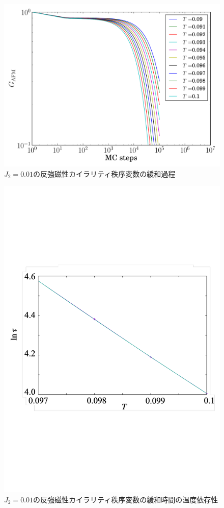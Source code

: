 \documentclass[12pt,titlepage,dvipdfmx]{jarticle}
\begin{document}
\begin{figure}[H]
   \centering
   \includegraphics[width=12cm]{figure/afvc_raw_data_j2_0.01.pdf}
   \caption{$J_2=0.01$の反強磁性カイラリティ秩序変数の緩和過程}
\end{figure}

\begin{figure}[H]
   \centering
   \includegraphics[width=12cm]{figure/afvc_Tc_j2_0.01.pdf}
   \caption{$J_2=0.01$の反強磁性カイラリティ秩序変数の緩和時間の温度依存性}
\end{figure}
\end{document}
